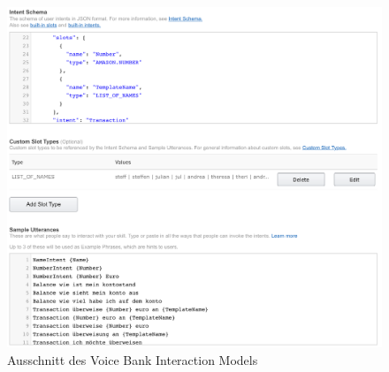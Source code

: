 \begin{figure}[!htb]
    \centering
    \includegraphics[width=1.0\textwidth]{bilder/4_interactionModel.png}
    \caption{Ausschnitt des Voice Bank Interaction Models}
    \label{fig:interaction-model}
\end{figure}

